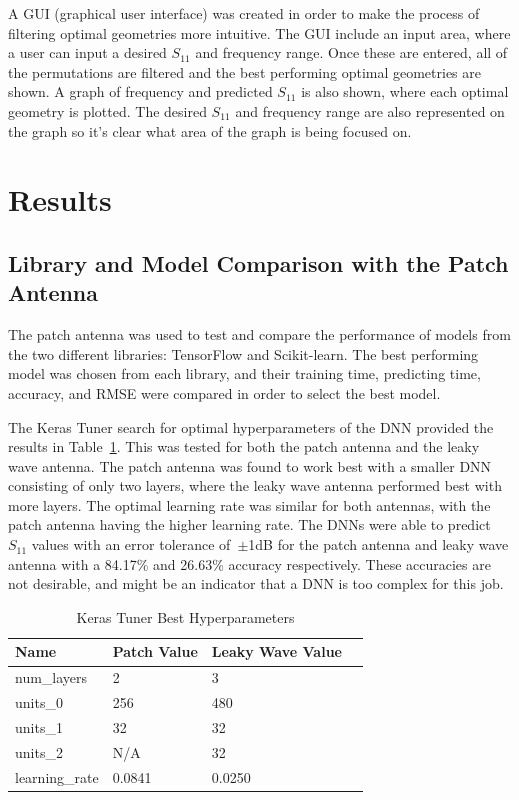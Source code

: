 \documentclass[lettersize,journal]{IEEEtran}
\begin{document}
A GUI (graphical user interface) was created in order to make the process of filtering optimal geometries more intuitive. The GUI include an input area, where a user can input a desired $S_{11}$ and frequency range. Once these are entered, all of the permutations are filtered and the best performing optimal geometries are shown. A graph of frequency and predicted $S_{11}$ is also shown, where each optimal geometry is plotted. The desired $S_{11}$ and frequency range are also represented on the graph so it's clear what area of the graph is being focused on.


\section{Results}
\subsection{Library and Model Comparison with the Patch Antenna}
The patch antenna was used to test and compare the performance of models from the two different libraries: TensorFlow and Scikit-learn. The best performing model was chosen from each library, and their training time, predicting time, accuracy, and RMSE were compared in order to select the best model.

The Keras Tuner search for optimal hyperparameters of the DNN provided the results in Table~\ref{keras_best_params}. This was tested for both the patch antenna and the leaky wave antenna. The patch antenna was found to work best with a smaller DNN consisting of only two layers, where the leaky wave antenna performed best with more layers. The optimal learning rate was similar for both antennas, with the patch antenna having the higher learning rate. The DNNs were able to predict $S_{11}$ values with an error tolerance of~$\pm$1dB for the patch antenna and leaky wave antenna with a 84.17\% and 26.63\% accuracy respectively. These accuracies are not desirable, and might be an indicator that a DNN is too complex for this job.

\begin{table}[h]
\caption{Keras Tuner Best Hyperparameters}
\begin{center}
\begin{tabular}{ |l|l|l|l| }
    \hline
    Name & Patch Value & Leaky Wave Value \\ 
    \hline
    num\_layers & 2 & 3 \\  
    \hline
    units\_0 & 256 & 480 \\
    \hline
    units\_1 & 32 & 32 \\
    \hline
    units\_2 & N/A & 32 \\
    \hline
    learning\_rate & 0.0841 & 0.0250 \\
    \hline
\end{tabular}
\end{center}
\label{keras_best_params}
\end{table}
\end{document}
